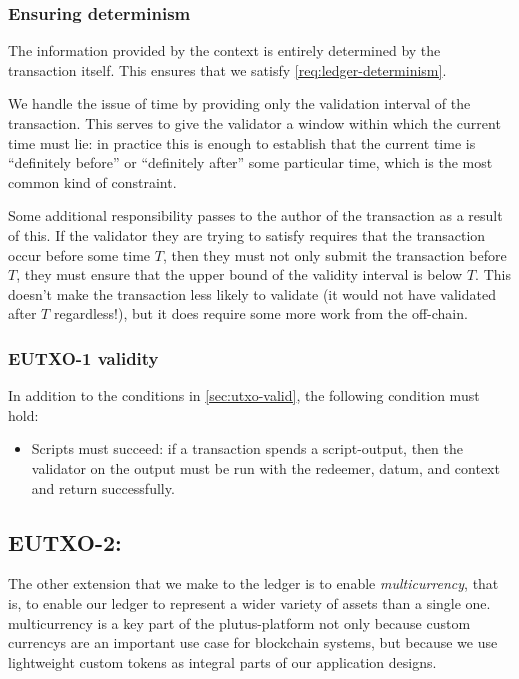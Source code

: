 \subsubsection{Ensuring determinism}
The information provided by the \gls{context} is entirely determined by the transaction itself.
This ensures that we satisfy \cref{req:ledger-determinism}.

We handle the issue of time by providing only the validation interval of the transaction.
This serves to give the \gls{validator} a window within which the current time must lie: in practice this is enough to establish that the current time is ``definitely before'' or ``definitely after'' some particular time, which is the most common kind of constraint.

Some additional responsibility passes to the author of the transaction as a result of this.
If the \gls{validator} they are trying to satisfy requires that the transaction occur before some time $T$, then they must not only submit the transaction before $T$, they must ensure that the upper bound of the validity interval is below $T$.
This doesn't make the transaction less likely to validate (it would not have validated after $T$ regardless!), but it does require some more work from the \gls{off-chain}.

\subsubsection{EUTXO-1 validity}
\label{sec:eutxo-1-valid}

In addition to the conditions in \cref{sec:utxo-valid}, the following condition must hold:
\begin{itemize}
\item Scripts must succeed: if a transaction spends a \gls{script-output}, then the \gls{validator} on the output must be run with the \gls{redeemer}, \gls{datum}, and \gls{context} and return successfully.
\end{itemize}

\subsection{EUTXO-2: }
\label{sec:multicurrency}


The other extension that we make to the ledger is to enable \emph{\gls{multicurrency}}, that is, to enable our ledger to represent a wider variety of assets than a single one.
\Gls{multicurrency} is a key part of the \gls{plutus-platform} not only because custom \glspl{currency} are an important use case for blockchain systems, but because we use lightweight custom \glspl{token} as integral parts of our application designs.

